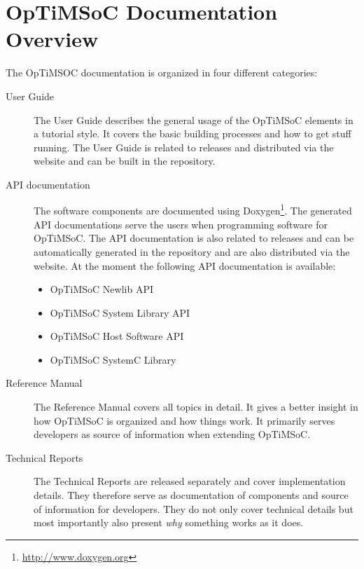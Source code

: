 
\section*{OpTiMSoC Documentation Overview}

The OpTiMSOC documentation is organized in four different categories:

\begin{description}
\item[User Guide] The User Guide describes the general usage of the
  OpTiMSoC elements in a tutorial style. It covers the basic building
  processes and how to get stuff running. The User Guide is related to
  releases and distributed via the website and can be built in the
  repository. 
\item[API documentation] The software components are documented using
  Doxygen\footnote{\url{http://www.doxygen.org}}. The generated API
  documentations serve the users when programming software for
  OpTiMSoC. The API documentation is also related to releases and can
  be automatically generated in the repository and are also
  distributed via the website. At the moment the following API
  documentation is available:
  \begin{itemize}
  \item OpTiMSoC Newlib API
  \item OpTiMSoC System Library API
  \item OpTiMSoC Host Software API
  \item OpTiMSoC SystemC Library
  \end{itemize}
\item[Reference Manual] The Reference Manual covers all topics in
  detail. It gives a better insight in how OpTiMSoC is organized and
  how things work. It primarily serves developers as source of
  information when extending OpTiMSoC.
\item[Technical Reports] The Technical Reports are released separately
  and cover implementation details. They therefore serve as
  documentation of components and source of information for
  developers. They do not only cover technical details but most
  importantly also present \emph{why} something works as it does.
\end{description}